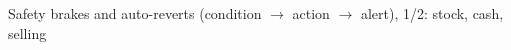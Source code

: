 \documentclass[10pt]{article}
\begin{document}
\newcommand{\brk}[7]{\node[ownbox, anchor=north, text width=6.3cm, align=left, font=\scriptsize] at (#1,#2)
  {\textbf{#3}\\ \textbf{if} #4\\ \textbf{then} #5\\ \textbf{alert} #6\\ \textbf{state} #7};}
\newpage
{} Safety brakes and auto-reverts (condition $\rightarrow$ action $\rightarrow$ alert), 1/2: stock, cash, selling\par
\vspace{2mm}
\end{document}
